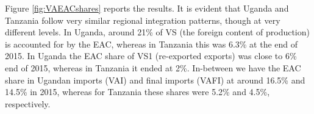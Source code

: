 \documentclass[a4paper]{article}
\begin{document}
%
%
%
%
%

Figure \ref{fig:VAEACshares} reports the results. It is evident that Uganda and Tanzania follow very similar regional integration patterns, though at very different levels. In Uganda, around 21\% of VS (the foreign content of production) is accounted for by the EAC, whereas in Tanzania this was 6.3\% at the end of 2015. In Uganda the EAC share of VS1 (re-exported exports) was close to 6\% end of 2015, whereas in Tanzania it ended at 2\%. In-between we have the EAC share in Ugandan imports (VAI) and final imports (VAFI) at around 16.5\% and 14.5\% in 2015, whereas for Tanzania these shares were 5.2\% and 4.5\%, respectively. 

\end{document}
